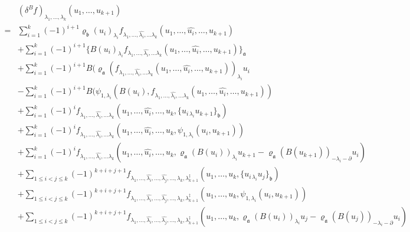 \documentclass[a4paper,11pt]{article}
\def\Vs{\mathfrak{a}}
\def\Ws{\mathfrak{b}}
\def\rep{\varrho}
\def\la{\lambda}
\numberwithin{equation}{section}
\begin{document}
\begin{align*}
 & (\delta^B f)_{\la_1,\ldots,\la_k}
  (u_1,\ldots,u_{k+1}) \\
 = & \sum_{i=1}^{k}(-1)^{i+1}
     \rep_\Ws(u_i)_{\la_i}
     f_{\la_1,\ldots,\widehat{\la_i},\ldots \la_k}(u_1,\ldots,\widehat{u_i},\ldots,u_{k+1})
     \\
  &+\sum_{i=1}^{k}(-1)^{i+1}
     \{B(u_i)_{\la_i}
     f_{\la_1,\ldots,\widehat{\la_i},\ldots \la_k}(u_1,\ldots,\widehat{u_i},\ldots,u_{k+1})\}_\Vs
     \\
  &+\sum_{i=1}^{k}(-1)^{i+1}
    B (\rep_\Vs(f_{\la_1,\ldots,\widehat{\la_i},\ldots \la_k}(u_1,\ldots,\widehat{u_i},\ldots,u_{k+1}))_{\la_i}u_i
     \\
  &-\sum_{i=1}^{k}(-1)^{i+1}
    B( \psi_{1,\la_i}(B(u_i),
     f_{\la_1,\ldots,\widehat{\la_i},\ldots \la_k}(u_1,\ldots,\widehat{u_i},\ldots,u_{k+1}))
     \\
  &
    + \sum_{i=1}^{k}(-1)^i
    f_{\la_1,\ldots,\widehat{\la_i},\ldots \la_k}
      (u_1,\ldots,\widehat{u_i},\ldots,u_k,
       \{u_{i\,\la_i} u_{k+1}\}_\Ws)
      \\&
    + \sum_{i=1}^{k}(-1)^i
    f_{\la_1,\ldots,\widehat{\la_i},\ldots \la_k}
      (u_1,\ldots,\widehat{u_i},\ldots,u_k,
      \psi_{1,\la_i} (u_{i}, u_{k+1}))
      \\&
    + \sum_{i=1}^{k}(-1)^i
    f_{\la_1,\ldots,\widehat{\la_i},\ldots \la_k}
      (u_1,\ldots,\widehat{u_i},\ldots,u_k,
       \rep_\Vs(B(u_i))_{\la_i}u_{k+1}-\rep_\Vs(B(u_{k+1}))_{-\la_i-\partial}u_i)
      \\
  &
    + \!\!\sum_{1\leq i<j\leq k}\!\!(-1)^{k+i+j+1}
      f_{\la_1,\ldots,\widehat{\la_i},\ldots ,\widehat{\la_j},\ldots, \la_k,\la_{k+1}^\ddag}
      (u_1,\ldots,u_k,\{u_{i\,\la_i}u_j\}_\Ws)\\
  &
    + \!\!\sum_{1\leq i<j\leq k}\!\!(-1)^{k+i+j+1}
      f_{\la_1,\ldots,\widehat{\la_i},\ldots ,\widehat{\la_j},\ldots, \la_k,\la_{k+1}^\ddag}
      (u_1,\ldots,u_k,\psi_{1,\la_i} (u_{i}, u_{k+1}))\\
  &
    + \!\!\sum_{1\leq i<j\leq k}\!\!(-1)^{k+i+j+1}
      f_{\la_1,\ldots,\widehat{\la_i},\ldots ,\widehat{\la_j},\ldots, \la_k,\la_{k+1}^\ddag}
    (u_1,\ldots,u_k,\rep_\Vs(B(u_i))_{\la_i}u_j-\rep_\Vs(B(u_j))_{-\la_i-\partial}u_i)

\end{align*}
\end{document}
